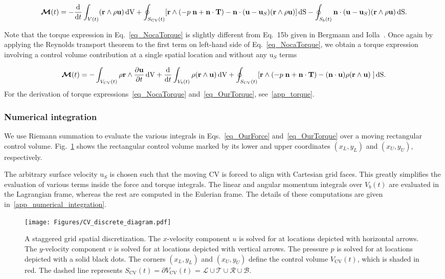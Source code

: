 \documentclass[review]{elsarticle}
\renewcommand \d [2]{\frac{{\rm d} #1}{{\rm d} #2}}
\newcommand \D [2]{\frac{\partial #1}{\partial #2}}
\renewcommand{\vec}[1]{\bm{\mathrm{#1}}}
\def \n{\vec{n}}
\def \r{\vec{r}}
\def \u{\vec{u}}
\def \uS{\vec{u}_S}
\def \T{\vec{T}}
\def \cM{\vec{\mathcal{M}}}
\def \Sbt{S_b(t)}
\def  \Scvt{S_\text{CV}(t)}
\def \Vt{V(t)}
\def \Vbt{V_b(t)}
\def  \Vcvt{V_\text{CV}(t)}
\def \cB{\mathcal{B}}
\def \cR{{\mathcal{R}}}
\def \cL{{\mathcal{L}}}
\def \cT{\mathcal{T}}
\def \n{\vec{n}}
\def \u{\vec{u}}
\def \xL{x_L}
\def \yL{y_L}
\def \xU{x_U}
\def \yU{y_U}
\def \dS{\,\mathrm{dS}}
\def \dV{\,\mathrm{dV}}
\def \ndot{\n \cdot}
\def \rcross{\r \wedge}
\begin{document}
\begin{equation}
\label{eq_NocaTorque}
\cM(t) =  -\d{}{t} \int_{\Vt} (\rcross \rho \u) \dV
	+ \oint_{\Scvt} [\rcross (- p \; \n +  \ndot \T) - \ndot (\u-\uS) (\rcross \rho \u)  ] \dS 
	- \oint_{\Sbt} \ndot (\u - \uS)(\rcross \rho \u) \dS. 
\end{equation}

\noindent Note that the torque expression in Eq.~\eqref{eq_NocaTorque} is slightly 
different from Eq.~15b given in Bergmann and  Iolla~\cite{Bergmann11}. 
Once again by applying the Reynolds transport theorem to the first term on 
left-hand side of Eq.~\eqref{eq_NocaTorque}, we obtain a torque 
expression involving a control volume contribution at a single spatial location
and without any $\uS$ terms

\begin{equation}
\label{eq_OurTorque}
\cM(t) = 
-\int_{\Vcvt} \rho \rcross \D{\u}{t}\dV
+ \d{}{t} \int_{\Vbt} \rho (\rcross \u) \dV 
+ \oint_{\Scvt}  [\rcross (- p \; \n + \ndot \T) - (\ndot \u)\rho (\rcross \u) \;]  \dS.
\end{equation}
For the derivation of torque expressions~\eqref{eq_NocaTorque} and~\eqref{eq_OurTorque},
see~\ref{app_torque}.



\subsubsection{Numerical integration}
We use Riemann summation to evaluate the various integrals in 
Eqs.~\eqref{eq_OurForce} and~\eqref{eq_OurTorque} over a moving rectangular control volume. 
Fig.~\ref{fig_CV_discrete} shows the rectangular control volume marked by its 
lower and upper coordinates $(\xL,\yL)$ and $(\xU,\yU)$, respectively. 

The arbitrary surface velocity $\uS$ is chosen such that the moving CV is forced to
align with Cartesian grid faces.
This greatly simplifies the evaluation of various terms inside the force and torque integrals. 
The linear and angular momentum integrals over $\Vbt$ are 
evaluated in the Lagrangian frame, whereas the rest are computed in the Eulerian frame. 
The details of these computations are given in~\ref{app_numerical_integration}. 

\begin{figure}[H]
  \centering
    \texttt{[image: Figures/CV\_discrete\_diagram.pdf]}
  \caption{A staggered grid spatial discretization.
  The $x$-velocity component $u$ is solved for at locations depicted with horizontal arrows.
  The $y$-velocity component $v$ is solved for at locations depicted with vertical arrows.
  The pressure $p$ is solved for at locations depicted with a solid black dots.
  The corners $(\xL,\yL)$ and $(\xU,\yU)$ define the control volume $\Vcvt$, which is shaded in red.
  The dashed line represents $\Scvt = \partial \Vcvt$ = $\cL \cup \cT \cup \cR \cup \cB$.}
  \label{fig_CV_discrete}
\end{figure}
\end{document}
